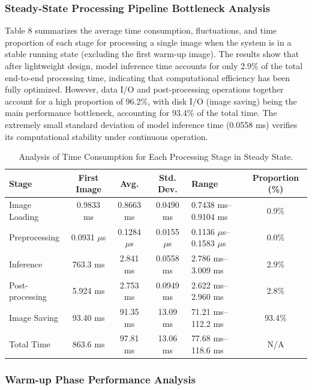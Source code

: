 \documentclass[sensors,article,submit,moreauthors]{Definitions/mdpi}
\begin{document}
\subsubsection{Steady-State Processing Pipeline Bottleneck Analysis}

Table 8 summarizes the average time consumption, fluctuations, and time proportion of each stage for processing a single image when the system is in a stable running state (excluding the first warm-up image). The results show that after lightweight design, model inference time accounts for only 2.9\% of the total end-to-end processing time, indicating that computational efficiency has been fully optimized. However, data I/O and post-processing operations together account for a high proportion of 96.2\%, with disk I/O (image saving) being the main performance bottleneck, accounting for 93.4\% of the total time. The extremely small standard deviation of model inference time (0.0558 ms) verifies its computational stability under continuous operation.

\begin{table}[H]
\caption{Analysis of Time Consumption for Each Processing Stage in Steady State.\label{tab8}}
\begin{tabularx}{\textwidth}{LCCCLC}
\toprule
\textbf{Stage}	& \textbf{First Image}	& \textbf{Avg.}	& \textbf{Std. Dev.}	& \textbf{Range}	& \textbf{Proportion (\%)}\\
\midrule
Image Loading	& 0.9833 ms	& 0.8663 ms	& 0.0490 ms	& 0.7438 ms--0.9104 ms	& 0.9\%\\
Preprocessing	& 0.0931 $\mu$s	& 0.1284 $\mu$s	& 0.0155 $\mu$s	& 0.1136 $\mu$s--0.1583 $\mu$s	& 0.0\%\\
Inference	& 763.3 ms	& 2.841 ms	& 0.0558 ms	& 2.786 ms--3.009 ms	& 2.9\%\\
Post-processing	& 5.924 ms	& 2.753 ms	& 0.0949 ms	& 2.622 ms--2.960 ms	& 2.8\%\\
Image Saving	& 93.40 ms	& 91.35 ms	& 13.09 ms	& 71.21 ms--112.2 ms	& 93.4\%\\
Total Time	& 863.6 ms	& 97.81 ms	& 13.06 ms	& 77.68 ms--118.6 ms	& N/A\\
\bottomrule
\end{tabularx}
\end{table}

\subsubsection{Warm-up Phase Performance Analysis}
\end{document}
